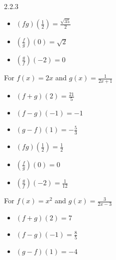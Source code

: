 \begin{Answer}{2.2.3}
\begin{multicols}{3}
\begin{itemize}
			\item  $(fg)\left(\frac{1}{2}\right) = \frac{\sqrt{35}}{2}$
			\item  $\left(\frac{f}{g}\right)(0) = \sqrt{2}$
			\item  $\left(\frac{g}{f}\right)\left(-2\right) = 0$

		\end{itemize}
	\end{multicols}

	\newpage

	\item For  $f(x) = 2x$ and  $g(x) = \frac{1}{2x+1}$

	\begin{multicols}{3}
		\begin{itemize}

			\item  $(f+g)(2) = \frac{21}{5}$
			\item  $(f-g)(-1) = -1$
			\item  $(g-f)(1) = -\frac{5}{3}$

		\end{itemize}
	\end{multicols}

	\begin{multicols}{3}
		\begin{itemize}

			\item  $(fg)\left(\frac{1}{2}\right) = \frac{1}{2}$
			\item  $\left(\frac{f}{g}\right)(0) = 0$
			\item  $\left(\frac{g}{f}\right)\left(-2\right) = \frac{1}{12}$

		\end{itemize}
	\end{multicols}

	\item For  $f(x) = x^2$ and $g(x) = \frac{3}{2x-3}$

	\begin{multicols}{3}
		\begin{itemize}

			\item  $(f+g)(2) = 7$
			\item  $(f-g)(-1) = \frac{8}{5}$
			\item  $(g-f)(1) = -4$

		\end{itemize}
	\end{multicols}

	\begin{multicols}{3}
		\begin{itemize}


\end{itemize}
\end{multicols}
\end{Answer}
